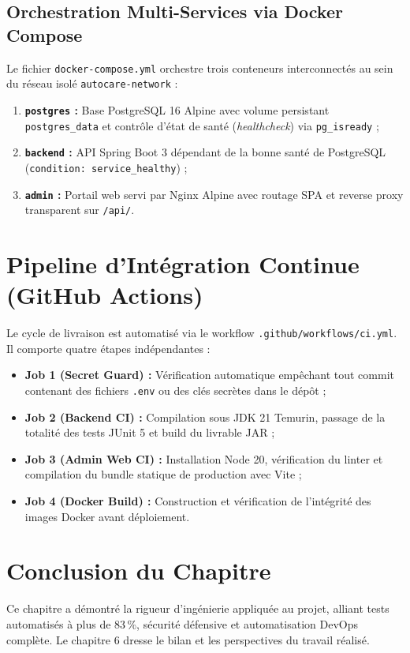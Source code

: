 \documentclass[12pt,a4paper,oneside]{report}
\newcommand{\bpuce}{\textcolor{midBlue}{$\blacktriangleright$}\;}
\begin{document}
\subsection{Orchestration Multi-Services via Docker Compose}
Le fichier \texttt{docker-compose.yml} orchestre trois conteneurs interconnect\'es au sein du r\'eseau isol\'e \texttt{autocare-network} :
\begin{enumerate}
  \item \textbf{\texttt{postgres} :} Base PostgreSQL 16 Alpine avec volume persistant \texttt{postgres\_data} et contr\^ole d'\'etat de sant\'e (\textit{healthcheck}) via \texttt{pg\_isready} ;
  \item \textbf{\texttt{backend} :} API Spring Boot 3 d\'ependant de la bonne sant\'e de PostgreSQL (\texttt{condition: service\_healthy}) ;
  \item \textbf{\texttt{admin} :} Portail web servi par Nginx Alpine avec routage SPA et reverse proxy transparent sur \texttt{/api/}.
\end{enumerate}

\section{Pipeline d'Int\'egration Continue (GitHub Actions)}
Le cycle de livraison est automatis\'e via le workflow \texttt{.github/workflows/ci.yml}. Il comporte quatre \'etapes ind\'ependantes :
\begin{itemize}[label=\bpuce]
  \item \textbf{Job 1 (Secret Guard) :} V\'erification automatique emp\^echant tout commit contenant des fichiers \texttt{.env} ou des cl\'es secr\`etes dans le d\'ep\^ot ;
  \item \textbf{Job 2 (Backend CI) :} Compilation sous JDK 21 Temurin, passage de la totalit\'e des tests JUnit 5 et build du livrable JAR ;
  \item \textbf{Job 3 (Admin Web CI) :} Installation Node 20, v\'erification du linter et compilation du bundle statique de production avec Vite ;
  \item \textbf{Job 4 (Docker Build) :} Construction et v\'erification de l'int\'egrit\'e des images Docker avant d\'eploiement.
\end{itemize}

\section{Conclusion du Chapitre}
Ce chapitre a d\'emontr\'e la rigueur d'ing\'enierie appliqu\'ee au projet, alliant tests automatis\'es \`a plus de 83\,\%, s\'ecurit\'e d\'efensive et automatisation DevOps compl\`ete. Le chapitre 6 dresse le bilan et les perspectives du travail r\'ealis\'e.
\end{document}
